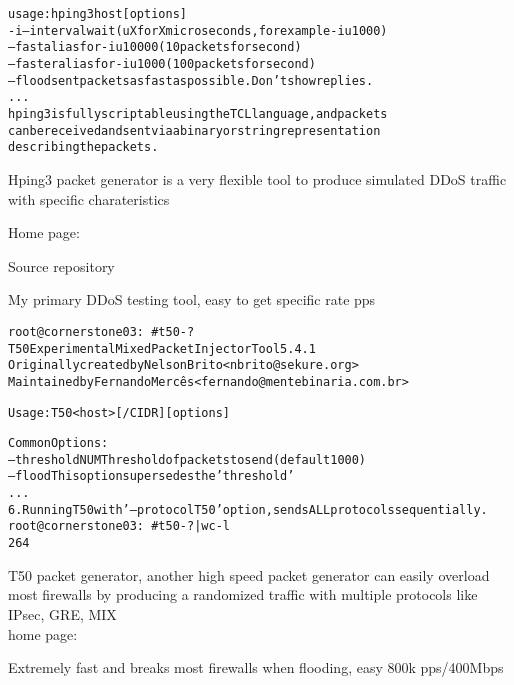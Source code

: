 \documentclass[Screen16to9,17pt]{foils}
\begin{document}

\begin{alltt}\footnotesize
usage: hping3 host [options]
  -i  --interval  wait (uX for X microseconds, for example -i u1000)
      --fast      alias for -i u10000 (10 packets for second)
      --faster    alias for -i u1000 (100 packets for second)
      --flood	   sent packets as fast as possible. Don't show replies.
...
hping3 is fully scriptable using the TCL language, and packets
can be received and sent via a binary or string representation
describing the packets.
\end{alltt}

\begin{list2}
\item Hping3 packet generator is a very flexible tool to produce simulated DDoS traffic with specific charateristics
\item Home page: 
\item Source repository 
\end{list2}

\centerline{My primary DDoS testing tool, easy to get specific rate pps}




\begin{alltt}\footnotesize
root@cornerstone03:~# t50 -?
T50 Experimental Mixed Packet Injector Tool 5.4.1
Originally created by Nelson Brito <nbrito@sekure.org>
Maintained by Fernando Mercês <fernando@mentebinaria.com.br>

Usage: T50 <host> [/CIDR] [options]

Common Options:
    --threshold NUM        Threshold of packets to send     (default 1000)
    --flood                This option supersedes the 'threshold'
...
6. Running T50 with '--protocol T50' option, sends ALL protocols sequentially.
root@cornerstone03:~# t50 -? | wc -l
264
\end{alltt}

\begin{list2}
\item T50 packet generator, another high speed packet generator
can easily overload most firewalls by producing a randomized traffic with multiple protocols like IPsec, GRE, MIX \\
home page: 
\end{list2}

\centerline{Extremely fast and breaks most firewalls when flooding, easy 800k pps/400Mbps}
\end{document}
